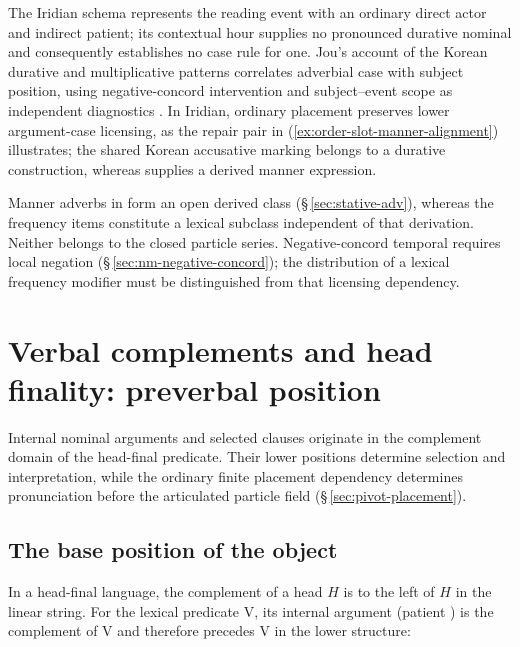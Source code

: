 The Iridian schema represents the reading event with an ordinary direct
actor and indirect patient; its contextual hour supplies no pronounced
durative nominal and consequently establishes no case rule for one.
Jou's account of the Korean durative and multiplicative patterns correlates
adverbial case with subject position, using negative-concord intervention
and subject--event scope as independent diagnostics
\cite[§§4--6]{jou2026}. In Iridian, ordinary placement preserves lower
argument-case licensing, as the repair pair in
(\ref{ex:order-slot-manner-alignment}) illustrates; the shared Korean
accusative marking belongs to a durative construction, whereas
 supplies a derived manner expression.

Manner adverbs in  form an open derived class
(§\,\ref{sec:stative-adv}), whereas the frequency items constitute a lexical
subclass independent of that derivation. Neither belongs to the closed
particle series. Negative-concord temporal  
requires local negation (§\,\ref{sec:nm-negative-concord}); the distribution
of a lexical frequency modifier must be distinguished from that licensing
dependency.


\section{Verbal complements and head finality: preverbal position}
\label{sec:vm-comp-headfinal}

Internal nominal arguments and selected clauses originate in the complement domain
of the head-final predicate. Their lower positions determine selection and
interpretation, while the ordinary finite placement dependency determines
pronunciation before the articulated particle field
(§\,\ref{sec:pivot-placement}).

\subsection{The base position of the object}
\label{sec:vm-obj-base}

In a head-final language, the complement of a head $H$ is to the
left of $H$ in the linear string. For the lexical predicate V, its
internal argument (patient ) is the complement of V and therefore
precedes V in the lower structure:

\begin{center}
\end{center}

